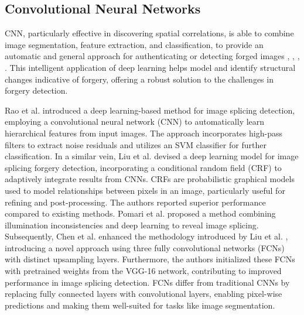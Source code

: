   \subsection{Convolutional Neural Networks } \label{sec:ss3}

CNN, particularly effective in discovering spatial correlations, is able to combine image segmentation, feature extraction, and classification, to provide an automatic and general approach for authenticating or detecting forged images \cite{tyagi2023mininet}, \cite{bunk2017detection}, \cite{wang2019detection},  \cite{zanardelli2023image}. This intelligent application of deep learning helps model and identify structural changes indicative of forgery, offering a robust solution to the challenges in forgery detection.


Rao et al. \cite{Rao2020DeepLL} introduced a deep learning-based method for image splicing detection, employing a convolutional neural network (CNN) to automatically learn hierarchical features from input images. The approach incorporates high-pass filters to extract noise residuals and utilizes an SVM classifier for further classification. In a similar vein, Liu et al. \cite{liu2018locating} devised a deep learning model for image splicing forgery detection, incorporating a conditional random field (CRF) to adaptively integrate results from CNNs. CRFs are probabilistic graphical models used to model relationships between pixels in an image, particularly useful for refining and post-processing. The authors reported superior performance compared to existing methods. Pomari et al. \cite{pomari2018image} proposed a method combining illumination inconsistencies and deep learning to reveal image splicing. Subsequently, Chen et al. \cite{chen2018improved} enhanced the methodology introduced by Liu et al. \cite{liu2018locating}, introducing a novel approach using three fully convolutional networks (FCNs) with distinct upsampling layers. Furthermore, the authors initialized these FCNs with pretrained weights from the VGG-16 network, contributing to improved performance in image splicing detection. FCNs differ from traditional CNNs by replacing fully connected layers with convolutional layers, enabling pixel-wise predictions and making them well-suited for tasks like image segmentation.

